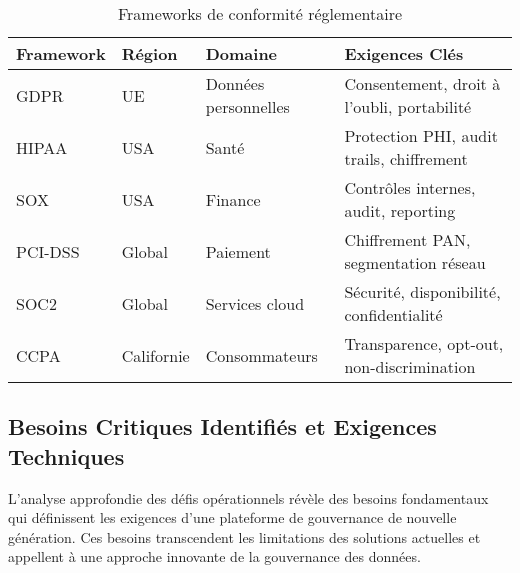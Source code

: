 \begin{table}[htpb]
\centering
\caption{Frameworks de conformité réglementaire}
\label{tab:frameworks_reglementaires}
\begin{tabular}{|p{}|p{}|p{}|p{}|}
\hline
\textbf{Framework} & \textbf{Région} & \textbf{Domaine} & \textbf{Exigences Clés} \\
\hline
GDPR & UE & Données personnelles & Consentement, droit à l'oubli, portabilité \\
\hline
HIPAA & USA & Santé & Protection PHI, audit trails, chiffrement \\
\hline
SOX & USA & Finance & Contrôles internes, audit, reporting \\
\hline
PCI-DSS & Global & Paiement & Chiffrement PAN, segmentation réseau \\
\hline
SOC2 & Global & Services cloud & Sécurité, disponibilité, confidentialité \\
\hline
CCPA & Californie & Consommateurs & Transparence, opt-out, non-discrimination \\
\hline
\end{tabular}
\end{table}

\subsection{Besoins Critiques Identifiés et Exigences Techniques}

L'analyse approfondie des défis opérationnels révèle des besoins fondamentaux qui définissent les exigences d'une plateforme de gouvernance de nouvelle génération. Ces besoins transcendent les limitations des solutions actuelles et appellent à une approche innovante de la gouvernance des données.

